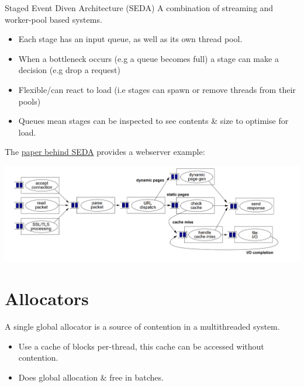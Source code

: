 \begin{definitionbox}{Staged Event Diven Architecture (SEDA)}
    A combination of streaming and worker-pool based systems.
    \begin{itemize}
        \item Each stage has an input queue, as well as its own thread pool.
        \item When a bottleneck occurs (e.g a queue becomes full) a stage can make a decision (e.g drop a request)
        \item Flexible/can react to load (i.e stages can spawn or remove threads from their pools)
        \item Queues mean stages can be inspected to see contents \& size to optimise for load.
    \end{itemize}
    The \href{https://web.archive.org/web/20120704004128/http://www.eecs.harvard.edu/~mdw/papers/mdw-phdthesis.pdf}{paper behind SEDA} provides a webserver example:
    \begin{center}
        \includegraphics[width=.9\textwidth]{parallelism/images/SEDA.png}
    \end{center}
\end{definitionbox}

\section{Allocators}
A single global allocator is a source of contention in a multithreaded system.
\begin{itemize}
    \item Use a cache of blocks per-thread, this cache can be accessed without contention.
    \item Does global allocation \& free in batches. 
\end{itemize}

